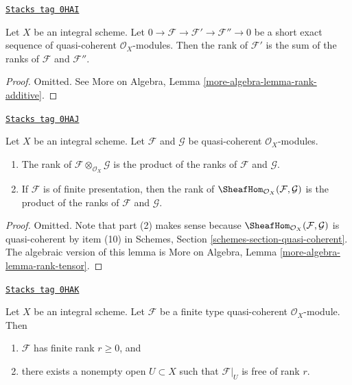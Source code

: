 \begin{lemma}
\label{divisors-lemma-rank-additive}
\href{https://stacks.math.columbia.edu/tag/0HAI}{\texttt{Stacks tag 0HAI}}

Let $X$ be an integral scheme.
Let $0 \to \mathcal{F} \to \mathcal{F}' \to \mathcal{F}'' \to 0$
be a short  exact sequence of quasi-coherent $\mathcal{O}_X$-modules.
Then the rank of $\mathcal{F}'$ is the sum of the ranks of
$\mathcal{F}$ and $\mathcal{F}''$.
\end{lemma}

\begin{proof}
Omitted. See More on Algebra, Lemma \ref{more-algebra-lemma-rank-additive}.
\end{proof}

\begin{lemma}
\label{divisors-lemma-rank-tensor}
\href{https://stacks.math.columbia.edu/tag/0HAJ}{\texttt{Stacks tag 0HAJ}}

Let $X$ be an integral scheme. Let
$\mathcal{F}$ and $\mathcal{G}$ be
quasi-coherent $\mathcal{O}_X$-modules.
\begin{enumerate}
\item The rank of $\mathcal{F} \otimes_{\mathcal{O}_X} \mathcal{G}$
is the product of the ranks of $\mathcal{F}$ and $\mathcal{G}$.
\item If $\mathcal{F}$ is of finite presentation, then
the rank of $\SheafHom_{\mathcal{O}_X}(\mathcal{F}, \mathcal{G})$
is the product of the ranks of $\mathcal{F}$ and $\mathcal{G}$.
\end{enumerate}
\end{lemma}

\begin{proof}
Omitted. Note that part (2) makes sense because
$\SheafHom_{\mathcal{O}_X}(\mathcal{F}, \mathcal{G})$
is quasi-coherent by item (10) in
Schemes, Section \ref{schemes-section-quasi-coherent}.
The algebraic version of this lemma is
More on Algebra, Lemma \ref{more-algebra-lemma-rank-tensor}.
\end{proof}

\begin{lemma}
\label{divisors-lemma-finite-module-rank}
\href{https://stacks.math.columbia.edu/tag/0HAK}{\texttt{Stacks tag 0HAK}}

Let $X$ be an integral scheme. Let $\mathcal{F}$ be a finite type
quasi-coherent $\mathcal{O}_X$-module. Then
\begin{enumerate}
\item $\mathcal{F}$ has finite rank $r \geq 0$, and
\item there exists a nonempty open $U \subset X$
such that $\mathcal{F}|_U$ is free of rank $r$.
\end{enumerate}
\end{lemma}

